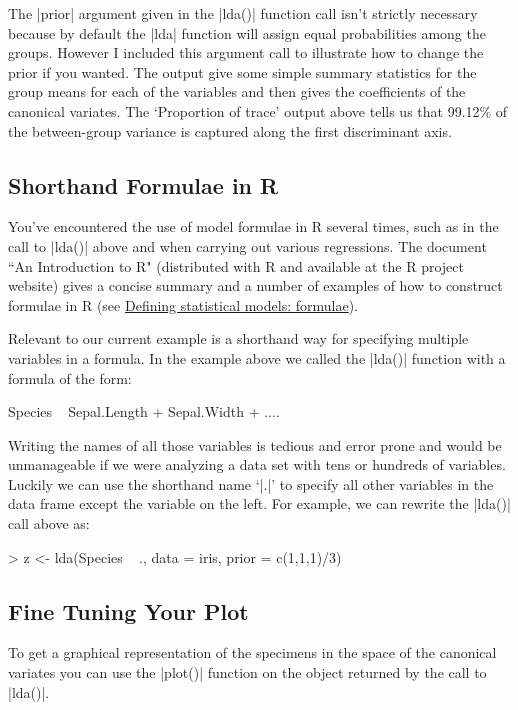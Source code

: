 The |prior| argument given in the |lda()| function call isn't strictly necessary because by default the |lda| function will assign equal probabilities among the groups. However I included this argument call to illustrate how to change the prior if you wanted. The output give some simple summary statistics for the group means for each of the variables and then gives the coefficients of the canonical variates.  The `Proportion of trace' output above tells us that 99.12\% of the between-group variance is captured along the first discriminant axis.

\subsection{Shorthand Formulae in R}

You've encountered the use of model formulae in R several times, such as in the call to |lda()| above and when carrying out various regressions.  The document ``An Introduction to R" (distributed with R and available at the R project website) gives a concise summary and a number of examples of how to construct formulae in R (see \href{http://cran.r-project.org/doc/manuals/R-intro.html#Formulae-for-statistical-models}{Defining statistical models: formulae}).

Relevant to our current example is a shorthand way for specifying multiple variables in a formula. In the example above we called the |lda()| function with a formula of the form:
\begin{R}
Species ~ Sepal.Length + Sepal.Width + ....
\end{R}

Writing the names of all those variables is tedious and error prone and would be unmanageable if we were analyzing a data set with tens or hundreds of variables. Luckily we can use the shorthand name `|.|' to specify all other variables in the data frame except the variable on the left.  For example, we can rewrite the |lda()| call above as:

\begin{R}
> z <- lda(Species ~ ., data = iris, prior = c(1,1,1)/3)
\end{R}

\subsection{Fine Tuning Your Plot}

To get a graphical representation of the specimens in the space of the canonical variates you can use the |plot()| function on the object returned by the call to |lda()|.

